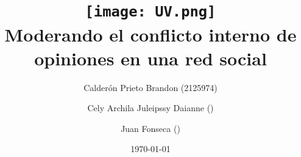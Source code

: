 \title{
	\texttt{[image: UV.png]} \\[1cm]
	Moderando el conflicto interno de opiniones en una red social
}
\author{
	Calderón Prieto Brandon (2125974) \and
	Cely Archila Juleipssy Daianne () \and
	Juan Fonseca () %
}
\date{\today}
